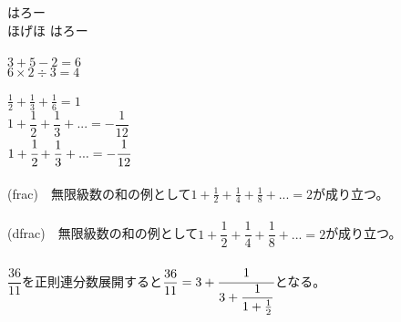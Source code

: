 \documentclass{ltjsarticle}
\begin{document}
はろー\\
ほげほ
はろー
\\ \\
\noindent
$3+5-2=6$\\
$6\times 2\div 3 = 4$
\\ \\
\noindent
$\frac{1}{2}+\frac{1}{3}+\frac{1}{6}=1$\\
$1+\dfrac{1}{2}+\dfrac{1}{3}+...=-\dfrac{1}{12}$\\
$1+\cfrac{1}{2}+\dfrac{1}{3}+...=-\cfrac{1}{12}$
\\ \\
\noindent
(frac)　無限級数の和の例として$1+\frac{1}{2}+\frac{1}{4}+\frac{1}{8}+...=2$が成り立つ。\\ \\
(dfrac)　無限級数の和の例として$1+\dfrac{1}{2}+\dfrac{1}{4}+\dfrac{1}{8}+...=2$が成り立つ。
\\ \\
\noindent
$\dfrac{36}{11}$を正則連分数展開すると$\dfrac{36}{11}=3+\cfrac{1}{3+\dfrac{1}{1+\frac{1}{2}}}$となる。
\end{document}
